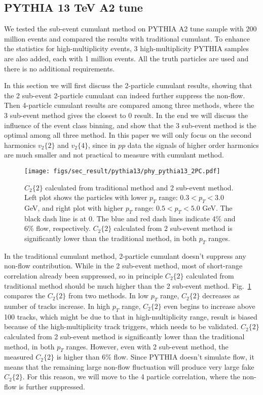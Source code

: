 \subsection{PYTHIA 13 TeV A2 tune}
We tested the sub-event cumulant method on PYTHIA A2 tune sample with 200 million events and compared the results with traditional cumulant. To enhance the statistics for high-multiplicity events, 3 high-multiplicity PYTHIA samples are also added, each with 1 million events. All the truth particles are used and there is no additional requirements.

In this section we will first discuss the 2-particle cumulant results, showing that the 2 sub-event 2-particle cumulant can indeed further suppress the non-flow. Then 4-particle cumulant results are compared among three methods, where the 3 sub-event method gives the closest to 0 result. In the end we will discuss the influence of the event class binning, and show that the 3 sub-event method is the optimal among all three method. In this paper we will only focus on the second harmonics $v_{2}\{2\}$ and $v_{2}\{4\}$, since in $pp$ data the signals of higher order harmonics are much smaller and not practical to measure with cumulant method.

\begin{figure}[H]
\centering
\texttt{[image: figs/sec\_result/pythia13/phy\_pythia13\_2PC.pdf]}
\caption{$C_{2}\{2\}$ calculated from traditional method and 2 sub-event method. Left plot shows the particles with lower $p_{T}$ range: $0.3<p_{T}<3.0$ GeV, and right plot with higher $p_{T}$ range: $0.5<p_{T}<5.0$ GeV. The black dash line is at 0. The blue and red dash lines indicate 4$\%$ and 6$\%$ flow, respectively. $C_{2}\{2\}$ calculated from 2 sub-event method is significantly lower than the traditional method, in both $p_{T}$ ranges.}
\label{fig:phy_pythia13_2PC}
\end{figure}

In the traditional cumulant method, 2-particle cumulant doesn't suppress any non-flow contribution. While in the 2 sub-event method, most of short-range correlation already been suppressed, so in principle $C_{2}\{2\}$ calculated from traditional method should be much higher than the 2 sub-event method. Fig.~\ref{fig:phy_pythia13_2PC} compares the $C_{2}\{2\}$ from two methods. In low $p_{T}$ range, $C_{2}\{2\}$ decreases as number of tracks increase. In high $p_{T}$ range, $C_{2}\{2\}$ even begins to increase above 100 tracks, which might be due to that in high-multiplicity range, result is biased because of the high-multiplicity track triggers, which needs to be validated. $C_{2}\{2\}$ calculated from 2 sub-event method is significantly lower than the traditional method, in both $p_{T}$ ranges. However, even with 2 sub-event method, the measured $C_{2}\{2\}$ is higher than $6\%$ flow. Since PYTHIA doesn't simulate flow, it means that the remaining large non-flow fluctuation will produce very large fake $C_{2}\{2\}$. For this reason, we will move to the 4 particle correlation, where the non-flow is further suppressed.

